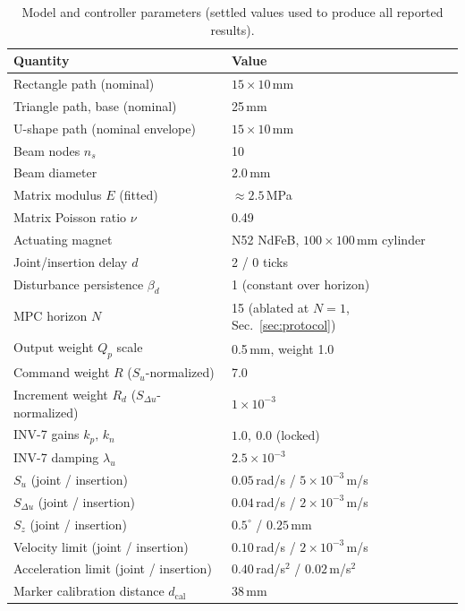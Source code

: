 \documentclass[journal]{IEEEtran}
\begin{document}
\begin{table}[t]
\centering
\caption{Model and controller parameters (settled values used to produce
all reported results).}
\label{tab:params}
\small
\begin{tabular}{@{}ll@{}}
\toprule
Quantity & Value \\
\midrule
Rectangle path (nominal) & $15\times10$\,mm \\
Triangle path, base (nominal) & 25\,mm \\
U-shape path (nominal envelope) & $15\times10$\,mm \\ %
Beam nodes $n_s$ & 10 \\
Beam diameter & 2.0\,mm \\
Matrix modulus $E$ (fitted) & $\approx2.5$\,MPa \\
Matrix Poisson ratio $\nu$ & 0.49 \\
Actuating magnet & N52 NdFeB, $100\times100$\,mm cylinder \\
Joint/insertion delay $d$ & 2 / 0 ticks \\
Disturbance persistence $\beta_d$ & 1 (constant over horizon) \\
MPC horizon $N$ & 15 (ablated at $N{=}1$, Sec.~\ref{sec:protocol}) \\
Output weight $Q_p$ scale & 0.5\,mm, weight 1.0 \\
Command weight $R$ ($S_u$-normalized) & 7.0 \\
Increment weight $R_d$ ($S_{\Delta u}$-normalized) & $1\times10^{-3}$ \\
INV-7 gains $k_p,\,k_n$ & $1.0,\ 0.0$ (locked) \\
INV-7 damping $\lambda_u$ & $2.5\times10^{-3}$ \\
$S_u$ (joint / insertion) & $0.05$\,rad/s / $5\times10^{-3}$\,m/s \\
$S_{\Delta u}$ (joint / insertion) & $0.04$\,rad/s / $2\times10^{-3}$\,m/s \\
$S_z$ (joint / insertion) & $0.5^{\circ}$ / $0.25$\,mm \\
Velocity limit (joint / insertion) & $0.10$\,rad/s / $2\times10^{-3}$\,m/s \\
Acceleration limit (joint / insertion) & $0.40$\,rad/s$^2$ / $0.02$\,m/s$^2$ \\
Marker calibration distance $d_{\mathrm{cal}}$ & 38\,mm \\
\bottomrule
\end{tabular}
\end{table}
\end{document}
